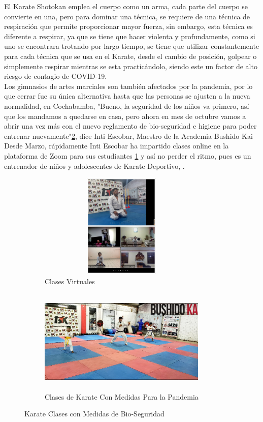El Karate Shotokan emplea el cuerpo como un arma, cada parte del cuerpo se convierte en una, pero para dominar una técnica, se requiere de una técnica de respiración que permite proporcionar mayor fuerza, sin embargo, esta técnica es diferente a respirar, ya que se tiene que hacer violenta y profundamente, como si uno se encontrara trotando por largo tiempo, se tiene que utilizar constantemente para cada técnica que se usa en el Karate, desde el cambio de posición, golpear o simplemente respirar mientras se esta practicándolo, siendo este un factor de alto riesgo de contagio de COVID-19. \\
Los gimnasios de artes marciales son también afectados por la pandemia, por lo que cerrar fue su única alternativa hasta que las personas se ajusten a la nueva normalidad, en Cochabamba, "Bueno, la seguridad de los niños va primero, así que los mandamos a quedarse en casa, pero ahora en mes de octubre vamos a abrir una vez más con el nuevo reglamento de bio-seguridad e higiene para poder entrenar nuevamente"\ref{claseenPandemia}, dice Inti Escobar, Maestro de la Academia Bushido Kai  Desde Marzo, rápidamente Inti Escobar ha impartido clases online en la plataforma de Zoom para sus estudiantes \ref{clasevirtual} y así no perder el ritmo, pues es un entrenador de niños y adolescentes de Karate Deportivo, .

\begin{figure}
	\centering
\begin{subfigure}{.5\textwidth}
	\centering
	\includegraphics[width=8cm,height=5cm]{./Images/ClaseVirtual.jpg}
	\caption{Clases Virtuales}
	\label{clasevirtual}
\end{subfigure}%
\begin{subfigure}{.5\textwidth}
	\centering
	\includegraphics[width=8cm,height=5cm]{./Images/ClaseEnPandemia.jpg}
	\caption{Clases de Karate Con Medidas Para la Pandemia}
	\label{claseenPandemia}
\end{subfigure}
\caption{Karate Clases con Medidas de Bio-Seguridad}
\label{karateclass}
\end{figure}



